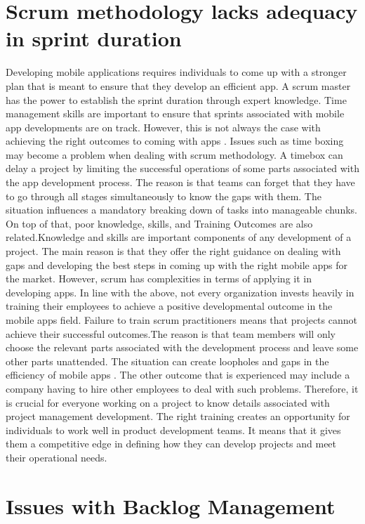 \documentclass{article}
\begin{document}
\section*{Scrum methodology lacks adequacy in sprint duration}
Developing mobile applications requires individuals to come up with a stronger plan that is meant to ensure that they develop an efficient app. A scrum master has the power to establish the sprint duration through expert knowledge. Time management skills are important to ensure that sprints associated with mobile app developments are on track. However, this is not always the case with achieving the right outcomes to coming with apps \cite{karabulutarticle}. Issues such as time boxing may become a problem when dealing with scrum methodology. A timebox can delay a project by limiting the successful operations of some parts associated with the app development process. The reason is that teams can forget that they have to go through all stages simultaneously to know the gaps with them. The situation influences a mandatory breaking down of tasks into manageable chunks. 
On top of that, poor knowledge, skills, and Training Outcomes are also related.Knowledge and skills are important components of any development of a project. The main reason is that they offer the right guidance on dealing with gaps and developing the best steps in coming up with the right mobile apps for the market. However, scrum has complexities in terms of applying it in developing apps. In line with the above, not every organization invests heavily in training their employees to achieve a positive developmental outcome in the mobile apps field. Failure to train scrum practitioners means that projects cannot achieve their successful outcomes.The reason is that team members will only choose the relevant parts associated with the development process and leave some other parts unattended. The situation can create loopholes and gaps in the efficiency of mobile apps \cite{alqudah2016review}. The other outcome that is experienced may include a company having to hire other employees to deal with such problems. Therefore, it is crucial for everyone working on a project to know details associated with project management development. The right training creates an opportunity for individuals to work well in product development teams. It means that it gives them a competitive edge in defining how they can develop projects and meet their operational needs. 

\section*{Issues with Backlog Management}
\end{document}
